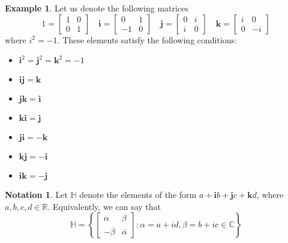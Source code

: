 \documentclass[11pt]{book}
\theoremstyle{definition}\newtheorem{definition}[subsection]{Definition}
\theoremstyle{definition}\newtheorem{example}[subsection]{Example}
\theoremstyle{definition}\newtheorem{notation}[subsection]{Notation}
\theoremstyle{definition}\newtheorem{remark}[subsection]{Remark}
\theoremstyle{theorem}\newtheorem{theorem}[subsection]{Theorem}
\theoremstyle{theorem}\newtheorem{lemma}[subsection]{Lemma}
\theoremstyle{theorem}\newtheorem{proposition}[subsection]{Proposition}
\theoremstyle{theorem}\newtheorem{corollary}[subsection]{Corollary}
\newcommand{\C}{\mathbb{C}}
\newcommand{\R}{\mathbb{R}}
\renewcommand{\H}{\mathbb{H}}
\begin{document}
\begin{example}\label{example:1.1.18}
    Let us denote the following matrices
    \begin{equation*}
        1 = \begin{bmatrix}
            1 & 0 \\ 0 & 1 
        \end{bmatrix} \quad
        \mathbf{i} = \begin{bmatrix}
            0 & 1 \\ - 1 & 0
        \end{bmatrix} \quad
        \mathbf{j} = \begin{bmatrix}
            0 & i \\ i & 0 
        \end{bmatrix} \quad
        \mathbf{k} = \begin{bmatrix}
            i & 0 \\ 0 & -i
        \end{bmatrix}
    \end{equation*}
    where $i^2 = -1$. These elements satisfy the following conditions:
    \begin{itemize}
        \item $\mathbf{i}^2 = \mathbf{j}^2 = \mathbf{k}^2 = -1$
        \item $\mathbf{ij} = \mathbf{k}$
        \item $\mathbf{jk} = \mathbf{i}$
        \item $\mathbf{ki} = \mathbf{j}$
        \item $\mathbf{ji} = -\mathbf{k}$
        \item $\mathbf{kj} = -\mathbf{i}$
        \item $\mathbf{ik} = -\mathbf{j}$
    \end{itemize}
\end{example}

\begin{notation}\label{notation:1.1.19}
    Let $\H$ denote the elements of the form $a + \mathbf{i}b + \mathbf{j}c + \mathbf{k}d$, where $a, b, c, d \in \R$. Equivalently, we can say that
    \begin{equation*}
        \H = \left\{\begin{bmatrix} \alpha & \beta \\ -\overline{\beta} & \overline{\alpha} \end{bmatrix} : \alpha = a + id, \beta = b + ic \in \C\right\}
    \end{equation*}
\end{notation}
\end{document}
